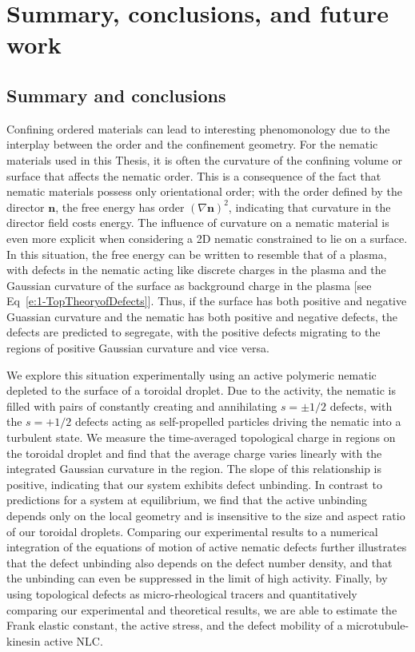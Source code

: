 \chapter{Summary, conclusions, and future work}

\section{Summary and conclusions}
Confining ordered materials can lead to interesting phenomonology due to the interplay between the order and the confinement geometry.
For the nematic materials used in this Thesis, it is often the curvature of the confining volume or surface that affects the nematic order.
This is a consequence of the fact that nematic materials possess only orientational order; with the order defined by the director $\mathbf{n}$, the free energy has order $(\nabla \mathbf{n})^2$, indicating that curvature in the director field costs energy.
The influence of curvature on a nematic material is even more explicit when considering a 2D nematic constrained to lie on a surface.
In this situation, the free energy can be written to resemble that of a plasma, with defects in the nematic acting like discrete charges in the plasma and the Gaussian curvature of the surface as background charge in the plasma  [see Eq~\ref{e:1-TopTheoryofDefects}].
Thus, if the surface has both positive and negative Guassian curvature and the nematic has both positive and negative defects, the defects are predicted to segregate, with the positive defects migrating to the regions of positive Gaussian curvature and vice versa.

We explore this situation experimentally using an active polymeric nematic depleted to the surface of a toroidal droplet.
Due to the activity, the nematic is filled with pairs of constantly creating and annihilating $s = \pm 1/2$ defects, with the $s = +1/2$ defects acting as self-propelled particles driving the nematic into a turbulent state.
We measure the time-averaged topological charge in regions on the toroidal droplet and find that the average charge varies linearly with the integrated Gaussian curvature in the region.
The slope of this relationship is positive, indicating that our system exhibits defect unbinding.
In contrast to predictions for a system at equilibrium, we find that the active unbinding depends only on the local geometry and is insensitive to the size and aspect ratio of our toroidal droplets.
Comparing our experimental results to a numerical integration of the equations of motion of active nematic defects further illustrates that the defect unbinding also depends on the defect number density, and that the unbinding can even be suppressed in the limit of high activity.
Finally, by using topological defects as micro-rheological tracers and quantitatively comparing our experimental and theoretical results, we are able to estimate the Frank elastic constant, the active stress, and the defect mobility of a microtubule-kinesin active NLC.

